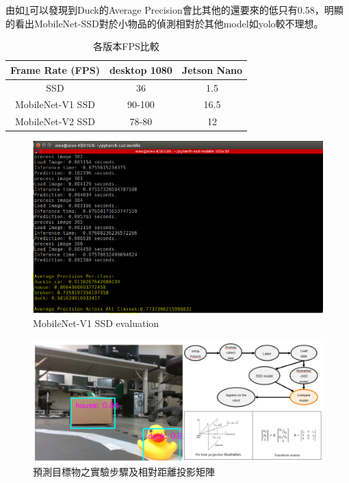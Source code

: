 由如\ref{figure:evaluation}可以發現到Duck的Average Precision會比其他的還要來的低只有0.58，明顯的看出MobileNet-SSD對於小物品的偵測相對於其他model如yolo較不理想。


\begin{table}[h]
	\centering
	\begin{tabular}{| c| c| c|}
		\hline
		Frame Rate (FPS) & desktop 1080 & Jetson Nano \\ 
		\hline
		SSD & 36 & 1.5 \\ 
		\hline
		MobileNet-V1 SSD  & 90-100 & 16.5 \\ 
		\hline 
		MobileNet-V2 SSD & 78-80 & 12 \\ 
 
		\hline 
	\end{tabular}
	\caption{各版本FPS比較}
	\label{table:fps_compare}
\end{table} 

\begin{figure}[h]
	\centering
	\includegraphics[height=!,width=\linewidth,keepaspectratio=true]
	{images/evaluation.png}
	\caption{MobileNet-V1 SSD evaluation}
	\label{figure:evaluation}
\end{figure}

\begin{figure}[h]
	\centering
	\includegraphics[height=!,width=\linewidth,keepaspectratio=true]
	{images/vision.png}
	\caption{預測目標物之實驗步驟及相對距離投影矩陣}
	\label{figure:vision}
\end{figure}



